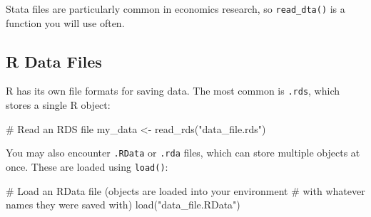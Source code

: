\documentclass[
  letterpaper,
  DIV=11,
  numbers=noendperiod]{scrreprt}
\newenvironment{Shaded}{\begin{snugshade}}{\end{snugshade}}
\newcommand{\CommentTok}[1]{\textcolor[rgb]{0.37,0.37,0.37}{#1}}
\newcommand{\FunctionTok}[1]{\textcolor[rgb]{0.28,0.35,0.67}{#1}}
\newcommand{\NormalTok}[1]{\textcolor[rgb]{0.00,0.23,0.31}{#1}}
\newcommand{\OtherTok}[1]{\textcolor[rgb]{0.00,0.23,0.31}{#1}}
\newcommand{\StringTok}[1]{\textcolor[rgb]{0.13,0.47,0.30}{#1}}
\begin{document}
Stata files are particularly common in economics research, so
\texttt{read\_dta()} is a function you will use often.

\subsection{R Data Files}\label{r-data-files}

R has its own file formats for saving data. The most common is
\texttt{.rds}, which stores a single R object:

\begin{Shaded}
\begin{Highlighting}[]
\CommentTok{\# Read an RDS file}
\NormalTok{my\_data }\OtherTok{\textless{}{-}} \FunctionTok{read\_rds}\NormalTok{(}\StringTok{"data\_file.rds"}\NormalTok{)}
\end{Highlighting}
\end{Shaded}

You may also encounter \texttt{.RData} or \texttt{.rda} files, which can
store multiple objects at once. These are loaded using \texttt{load()}:

\begin{Shaded}
\begin{Highlighting}[]
\CommentTok{\# Load an RData file (objects are loaded into your environment}
\CommentTok{\# with whatever names they were saved with)}
\FunctionTok{load}\NormalTok{(}\StringTok{"data\_file.RData"}\NormalTok{)}
\end{Highlighting}
\end{Shaded}
\end{document}
